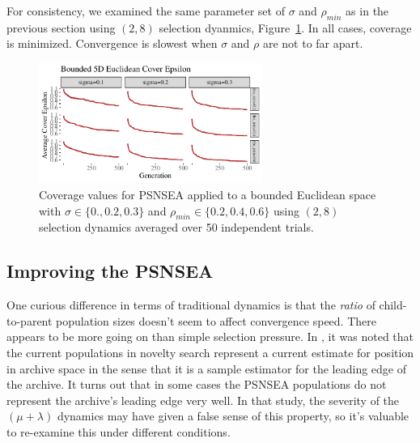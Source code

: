 \documentclass[twoside]{article}
\begin{document}
For consistency, we examined the same parameter set of $\sigma$ and $\rho_{min}$ as in the previous section using $(2,8)$ selection dyanmics, Figure~\ref{fig:bounded:mu2lam8:sm}.  In all cases, coverage is minimized.  Convergence is slowest when $\sigma$ and $\rho$ are not to far apart.
%
\begin{figure}[ht]
  \center\includegraphics[width=0.65\textwidth]{Figures/bounded-500-sm-mu2lam8.pdf}
  \caption{\label{fig:bounded:mu2lam8:sm} Coverage values for PSNSEA applied to a bounded Euclidean space with $\sigma\in\{0.,  0.2, 0.3\}$ and $\rho_{min} \in \{0.2, 0.4, 0.6\}$ using $(2,8)$ selection dynamics averaged over 50 independent trials.}
\end{figure}


\subsection{Improving the PSNSEA}
\label{subsec:psnsea:improve}

One curious difference in terms of traditional dynamics is that the \emph{ratio} of child-to-parent population sizes doesn't seem to affect convergence speed.  There appears to be more going on than simple selection pressure.  In \citet{Wiegand2021flairs}, it was noted that the current populations in novelty search represent a current estimate for position in archive space in the sense that it is a sample estimator for the leading edge of the archive.  It turns out that in some cases the PSNSEA populations do not represent the archive's leading edge very well.  In that study, the severity of the $(\mu+\lambda)$ dynamics may have given a false sense of this property, so it's valuable to re-examine this under different conditions.
\end{document}
